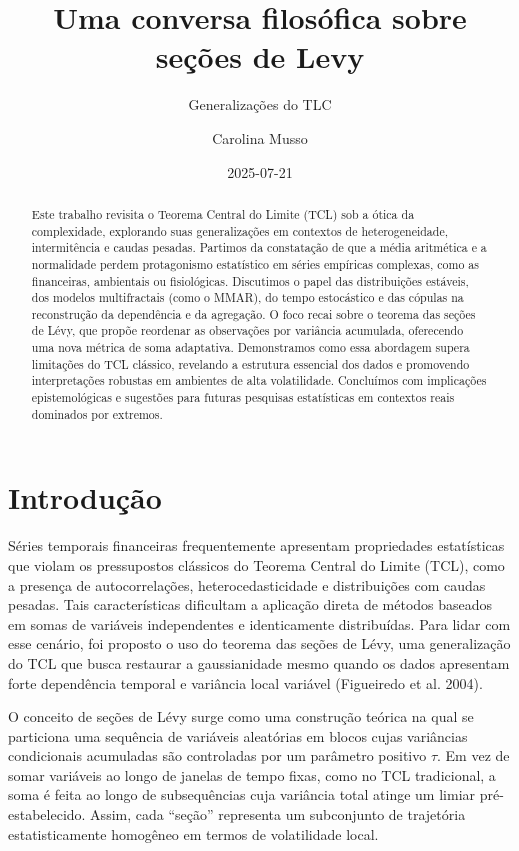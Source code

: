 \documentclass[
  letterpaper,
  DIV=11,
  numbers=noendperiod]{scrartcl}
\title{Uma conversa filosófica sobre seções de Levy}
\subtitle{Generalizações do TLC}
\author{Carolina Musso}
\date{2025-07-21}
\begin{document}
\maketitle
\begin{abstract}
Este trabalho revisita o Teorema Central do Limite (TCL) sob a ótica da
complexidade, explorando suas generalizações em contextos de
heterogeneidade, intermitência e caudas pesadas. Partimos da constatação
de que a média aritmética e a normalidade perdem protagonismo
estatístico em séries empíricas complexas, como as financeiras,
ambientais ou fisiológicas. Discutimos o papel das distribuições
estáveis, dos modelos multifractais (como o MMAR), do tempo estocástico
e das cópulas na reconstrução da dependência e da agregação. O foco
recai sobre o teorema das seções de Lévy, que propõe reordenar as
observações por variância acumulada, oferecendo uma nova métrica de soma
adaptativa. Demonstramos como essa abordagem supera limitações do TCL
clássico, revelando a estrutura essencial dos dados e promovendo
interpretações robustas em ambientes de alta volatilidade. Concluímos
com implicações epistemológicas e sugestões para futuras pesquisas
estatísticas em contextos reais dominados por extremos.
\end{abstract}

\section{Introdução}\label{introduuxe7uxe3o}

Séries temporais financeiras frequentemente apresentam propriedades
estatísticas que violam os pressupostos clássicos do Teorema Central do
Limite (TCL), como a presença de autocorrelações, heterocedasticidade e
distribuições com caudas pesadas. Tais características dificultam a
aplicação direta de métodos baseados em somas de variáveis independentes
e identicamente distribuídas. Para lidar com esse cenário, foi proposto
o uso do teorema das seções de Lévy, uma generalização do TCL que busca
restaurar a gaussianidade mesmo quando os dados apresentam forte
dependência temporal e variância local variável (Figueiredo et al.
2004).

O conceito de seções de Lévy surge como uma construção teórica na qual
se particiona uma sequência de variáveis aleatórias em blocos cujas
variâncias condicionais acumuladas são controladas por um parâmetro
positivo \(\tau\). Em vez de somar variáveis ao longo de janelas de
tempo fixas, como no TCL tradicional, a soma é feita ao longo de
subsequências cuja variância total atinge um limiar pré-estabelecido.
Assim, cada ``seção'' representa um subconjunto de trajetória
estatisticamente homogêneo em termos de volatilidade local.
\end{document}
